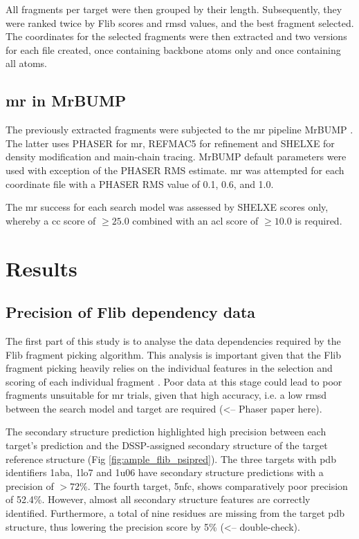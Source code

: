 All fragments per target were then grouped by their length. Subsequently, they were ranked twice by Flib scores and \gls{rmsd} values, and the best fragment selected. The coordinates for the selected fragments were then extracted and two versions for each file created, once containing backbone atoms only and once containing all atoms.

\subsection{\acrlong{mr} in MrBUMP}
The previously extracted fragments were subjected to the \gls{mr} pipeline MrBUMP \cite{Keegan2008-hk}. The latter uses PHASER \cite{McCoy2007-bf} for \gls{mr}, REFMAC5 \cite{Murshudov2011-we} for refinement and SHELXE \cite{Thorn2013-ir} for density modification and main-chain tracing. MrBUMP default parameters were used with exception of the PHASER RMS estimate. \gls{mr} was attempted for each coordinate file with a PHASER RMS value of 0.1, 0.6, and 1.0.

The \gls{mr} success for each search model was assessed by SHELXE scores only, whereby a \gls{cc} score of $\geq25.0$ combined with an \gls{acl} score of $\geq10.0$ is required.


\section{Results}
\subsection{Precision of Flib dependency data}
The first part of this study is to analyse the data dependencies required by the Flib fragment picking algorithm. This analysis is important given that the Flib fragment picking heavily relies on the individual features in the selection and scoring of each individual fragment \cite{De_Oliveira2015-ba}. Poor data at this stage could lead to poor fragments unsuitable for \gls{mr} trials, given that high accuracy, i.e. a low \gls{rmsd} between the search model and target are required \cite{} (<-- Phaser paper here).

The secondary structure prediction highlighted high precision between each target's prediction and the DSSP-assigned \cite{Frishman1995-ns} secondary structure of the target reference structure (Fig \ref{fig:ample_flib_psipred}). The three targets with \gls{pdb} identifiers 1aba, 1lo7 and 1u06 have secondary structure predictions with a precision of $>72$\%. The fourth target, 5nfc, shows comparatively poor precision of 52.4\%. However, almost all secondary structure features are correctly identified. Furthermore, a total of nine residues are missing from the target \gls{pdb} structure, thus lowering the precision score by 5\% (<-- double-check).

